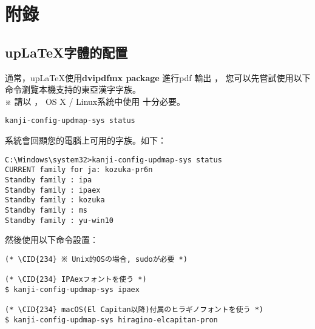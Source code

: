 
\clearpage

\section*{附\quad 錄}

\begin{appendix}

\section{up\LaTeX 字體的配置}
\par  通常，up\LaTeX 使用{\bfseries dvipdfmx package } 進行pdf 輸出 ，
您可以先嘗試使用以下命令瀏覽本機支持的東亞漢字字族。\\
※ 請\hspace{3pt}以 ，
OS X / Linux系統中使用  十分必要。
\begin{lstlisting}[firstnumber=1]
kanji-config-updmap-sys status
\end{lstlisting}

系統會回顯您的電腦上可用的字族。如下：
\begin{lstlisting}[firstnumber=1]
C:\Windows\system32>kanji-config-updmap-sys status
CURRENT family for ja: kozuka-pr6n
Standby family : ipa
Standby family : ipaex
Standby family : kozuka
Standby family : ms
Standby family : yu-win10
\end{lstlisting}

然後使用以下命令設置：
\begin{lstlisting}[firstnumber=1]
(* \CID{234} ※ Unix的OSの場合, sudoが必要 *)

(* \CID{234} IPAexフォントを使う *)
$ kanji-config-updmap-sys ipaex

(* \CID{234} macOS(El Capitan以降)付属のヒラギノフォントを使う *)
$ kanji-config-updmap-sys hiragino-elcapitan-pron


\end{lstlisting}
\end{appendix}
